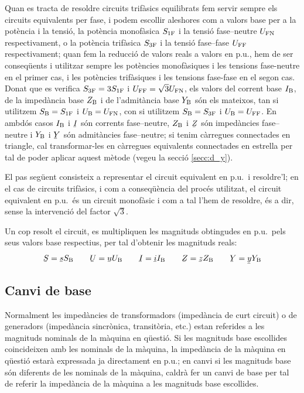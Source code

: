 Quan es tracta de resoldre circuits trif\`{a}sics equilibrats fem servir sempre els circuits equivalents per fase, i podem escollir aleshores com a valors base per a la pot\`{e}ncia i la tensi\'{o}, la pot\`{e}ncia monof\`{a}sica $S_\mathrm{1F}$ i la tensi\'{o} fase--neutre $U_\mathrm{FN}$ respectivament, o la pot\`{e}ncia trif\`{a}sica $S_\mathrm{3F}$ i la tensi\'{o} fase--fase $U_\mathrm{FF}$ respectivament; quan fem la reducci\'{o} de valors reals a valors en p.u., hem de ser conseq\"{u}ents i utilitzar sempre les pot\`{e}ncies monof\`{a}siques i les tensions fase-neutre en el primer cas, i les pot\`{e}ncies trif\`{a}siques i les tensions fase-fase en el segon cas. Donat que es verifica $S_\mathrm{3F}=3 S_\mathrm{1F}$ i $U_\mathrm{FF}=\sqrt{3}U_\mathrm{FN}$, els valors  del corrent base $I_\mathrm{B}$, de la imped\`{a}ncia base $Z_\mathrm{B}$ i  de l'admit\`{a}ncia base $Y_\mathrm{B}$ s\'{o}n els mateixos, tan si utilitzem $S_\mathrm{B}=S_\mathrm{1F}$ i $U_\mathrm{B}=U_\mathrm{FN}$, con si utilitzem $S_\mathrm{B}=S_\mathrm{3F}$ i $U_\mathrm{B}=U_\mathrm{FF}$. En ambd\'{o}s casos $I_\mathrm{B}$ i $\cmplx{I}$ s\'{o}n corrents fase--neutre, $Z_\mathrm{B}$ i $\cmplx{Z}$ s\'{o}n imped\`{a}ncies fase--neutre i $Y_\mathrm{B}$ i $\cmplx{Y}$ s\'{o}n admit\`{a}ncies fase--neutre; si tenim c\`{a}rregues connectades en triangle, cal transformar-les en c\`{a}rregues equivalents connectades en estrella per tal de poder aplicar aquest m\`{e}tode (vegeu la secci\'{o} \ref{secc:d_y}).

El pas seg\"{u}ent consisteix a representar el circuit equivalent en
p.u.\ i resoldre'l; en el cas de circuits trif\`{a}sics, i com a conseq\"{u}\`{e}ncia del proc\'{e}s utilitzat, el circuit equivalent en p.u.\ \'{e}s un circuit monof\`{a}sic i com a tal l'hem de resoldre, \'{e}s a dir, sense la intervenci\'{o} del factor $\sqrt{3}$.

Un cop resolt el circuit, es multipliquen les magnituds obtingudes en p.u.\ pels
seus valors base respectius, per tal d'obtenir les magnituds reals:
\begin{equation}
   \cmplx{S} = \cmplx{s} S\ped{B} \qquad \cmplx{U} = \cmplx{u} U\ped{B} \qquad \cmplx{I} = \cmplx{i} I\ped{B} \qquad \cmplx{Z} = \cmplx{z} Z\ped{B} \qquad \cmplx{Y} = \cmplx{y} Y\ped{B}
\end{equation}

\subsection{Canvi de base}\label{sec:canvi-base} 

Normalment les imped\`{a}ncies de transformadors (imped\`{a}ncia de curt circuit) o de generadors (imped\`{a}ncia sincr\`{o}nica, transit\`{o}ria, etc.) estan referides a les magnituds nominals de la m\`{a}quina en q\"{u}esti\'{o}. Si les magnituds base escollides coincideixen amb les nominals de la m\`{a}quina,
la imped\`{a}ncia de la m\`{a}quina en q\"{u}esti\'{o} estar\`{a} expressada ja directament en p.u.; en canvi si les magnituds base s\'{o}n diferents de les nominals de la m\`{a}quina, caldr\`{a} fer un canvi de base per tal de referir la imped\`{a}ncia de la m\`{a}quina a les magnituds base escollides.

